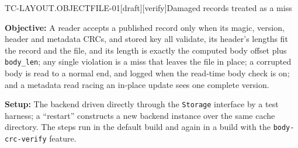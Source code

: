 \begin{requirement}{TC-LAYOUT.OBJECTFILE-01}[draft][verify]{Damaged records treated as a miss}


  \textbf{Objective:} A reader accepts a published record only when its
  magic, version, header and metadata CRCs, and stored key all validate, its
  header's lengths fit the record and the file, and its length is exactly
  the computed body offset plus \texttt{body\_len}; any single violation is a miss that leaves the file in
  place; a corrupted body is read to a normal end, and logged when the
  read-time body check is on; and a metadata read racing an in-place update
  sees one complete version.

  \textbf{Setup:} The backend driven directly through the \texttt{Storage}
  interface by a test harness; a ``restart'' constructs a new backend instance
  over the same cache directory. The steps run in the default build and again
  in a build with the \texttt{body-crc-verify} feature.


\end{requirement}
